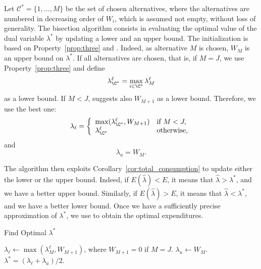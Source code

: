 \documentclass[12pt,a4paper]{article}
\begin{document}
Let $\mathcal{C}^*=\{1,\ldots, M \}$ be the set of chosen alternatives, where the alternatives are numbered in
decreasing order of $W_i$, which is assumed not empty, without loss of generality. The bisection algorithm consists in evaluating the optimal value of the dual variable $\lambda^*$
by updating a lower and an upper bound.
The initialization is based on Property~\ref{prop:three} and . Indeed, as alternative $M$ is chosen,
$W_M$ is an upper bound on $\lambda^*$.
If all alternatives are chosen, that is, if $M=J$, we use Property~\ref{prop:three} and define
\[
   \lambda^\ell_{\C^*} =  \max_{i\in \C^*} \lambda^\ell_{M}
\]
as a lower bound.
If $M < J$,  suggests also $W_{M+1}$ as a lower bound. Therefore, we use the best one:\[
    \lambda_{\ell}  =\left\{\begin{array}{ll}
         \max(\lambda^\ell_{\C^*}, W_{M+1}) & \text{if } M < J, \\
                       \lambda^\ell_{\C^*}  & \text{otherwise}, \\
    \end{array}\right.
    \]
    and
    \[
         \lambda_{u} = W_{M}.
    \]


    The algorithm then exploits Corollary~\ref{cor:total_consumption} to update either the lower or the upper bound.
Indeed, if $E(\widehat{\lambda}) < E$, it means that $\widehat{\lambda} > \lambda^*$, and we have a better upper bound.
Similarly, if $E(\widehat{\lambda}) > E$, it means that $\widehat{\lambda} < \lambda^*$, and we have a better lower bound.
Once we have a sufficiently precise approximation of $\lambda^*$, we use  to obtain the
optimal expenditures.



\begin{algorithm}[htb]
\caption{\label{algo:bisection}Find Optimal $\lambda^*$}
\DontPrintSemicolon
{}
\BlankLine
$\lambda_\ell \leftarrow \max(\lambda^\ell_{M}, W_{M+1})$, where $W_{M+1}=0$ if $M=J$.\;
$\lambda_u \leftarrow W_M$.\;
$\lambda^* = (\lambda_{\ell} + \lambda_u) / 2$.\;
\end{algorithm}
\end{document}
